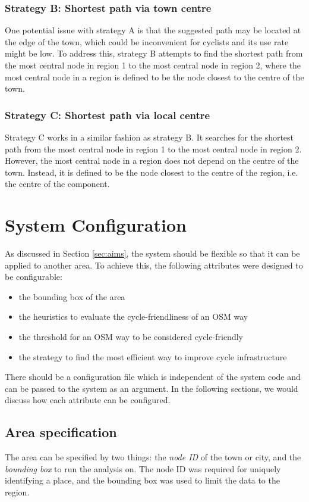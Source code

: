 \documentclass[12pt,a4paper]{report}
\begin{document}
\subsubsection*{Strategy B: Shortest path via town centre}
One potential issue with strategy A is that the suggested path may be located at the edge of the town, which could be inconvenient for cyclists and its use rate might be low. To address this, strategy B attempts to find the shortest path from the most central node in region 1 to the most central node in region 2, where the most central node in a region is defined to be the node closest to the centre of the town.

\subsubsection*{Strategy C: Shortest path via local centre}
Strategy C works in a similar fashion as strategy B. It searches for the shortest path from the most central node in region 1 to the most central node in region 2. However, the most central node in a region does not depend on the centre of the town. Instead, it is defined to be the node closest to the centre of the region, i.e. the centre of the component.

\section{System Configuration}
As discussed in Section \ref{sec:aims}, the system should be flexible so that it can be applied to another area. To achieve this, the following attributes were designed to be configurable:

\begin{itemize}
    \item the bounding box of the area
    \item the heuristics to evaluate the cycle-friendliness of an OSM way
    \item the threshold for an OSM way to be considered cycle-friendly
    \item the strategy to find the most efficient way to improve cycle infrastructure
\end{itemize}

There should be a configuration file which is independent of the system code and can be passed to the system as an argument. In the following sections, we would discuss how each attribute can be configured.

\subsection{Area specification}
The area can be specified by two things: the \textit{node ID} of the town or city, and the \textit{bounding box} to run the analysis on. The node ID was required for uniquely identifying a place, and the bounding box was used to limit the data to the region.
\end{document}
